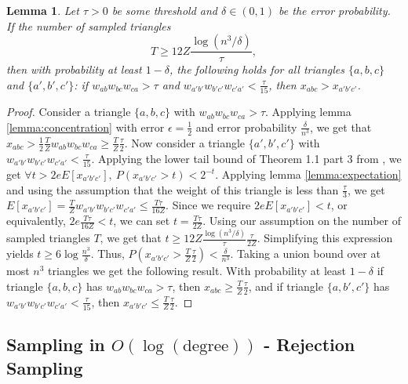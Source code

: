 \documentclass{article}
\newtheorem{lemma}{Lemma}
\begin{document}
\begin{lemma}
Let $\tau > 0$ be some threshold and $\delta \in (0,1)$ be
the error probability.
If the number of sampled triangles
\begin{equation*}
  T \geq 12 Z \frac{\log{(n^3/\delta)}}{\tau},
\end{equation*}
then with probability at least $1 - \delta$, the following
holds for all triangles $\{a,b,c\}$ and $\{a',b',c'\}$: if
$w_{ab}w_{bc}w_{ca} > \tau$ and $w_{a'b'}w_{b'c'}w_{c'a'} <
\frac{\tau}{15}$, then $x_{abc} > x_{a'b'c'}$.
\end{lemma}
\begin{proof}
Consider a triangle $\{a,b,c\}$ with $w_{ab}w_{bc}w_{ca} > 
\tau$. Applying lemma \ref{lemma:concentration} with
error $\epsilon = \frac{1}{2}$ and error probability
$\frac{\delta}{n^3}$, we get that $x_{abc} > \frac{1}{2}
\frac{T}{Z} w_{ab}w_{bc}w_{ca} \geq \frac{T}{Z} \frac{\tau}{2}$.
Now consider a triangle $\{a',b',c'\}$ with $w_{a'b'}w_{b'c'}w_{c'a'} < \frac{\tau}{15}$. Applying the
lower tail bound of Theorem 1.1 part 3 from \cite{concentration-book}, we get $\forall t > 2e E[x_{a'b'c'}],\ P(x_{a'b'c'} > t) < 2^{-t}$. Applying lemma 
\ref{lemma:expectation} and using the assumption that the
weight of this triangle is less than $\frac{\tau}{3}$, we 
get $E[x_{a'b'c'}] = \frac{T}{Z}w_{a'b'}w_{b'c'}w_{c'a'}
\leq \frac{T\tau}{16Z}$. Since we require $2e E[x_{a'b'c'}]
< t$, or equivalently, $2e \frac{T\tau}{16Z} < t$, we can
set $t = \frac{T\tau}{2Z}$. Using our assumption on the
number of sampled triangles $T$, we get that $t \geq 12 Z
\frac{\log{(n^3/\delta)}}{\tau} \frac{\tau}{2Z}$.
Simplifying this expression yields $t \geq 6 \log{\frac{n^3}{\delta}}$. Thus, $P(x_{a'b'c'} > \frac{T}{Z} \frac{\tau}{2}) < \frac{\delta}{n^3}$.
Taking a union bound over at most $n^3$ triangles we get the
following result. With probability at least $1-\delta$
if triangle $\{a,b,c\}$ has $w_{ab}w_{bc}w_{ca}>\tau$, then
$x_{abc} \geq \frac{T}{Z} \frac{\tau}{2}$, and if triangle
$\{a,b',c'\}$ has $w_{a'b'}w_{b'c'}w_{c'a'} < 
\frac{\tau}{15}$, then $x_{a'b'c'} \leq \frac{T}{Z}\frac{\tau}{2}$.
\end{proof}


\subsection{Sampling in $O(\log(\text{degree}))$ - Rejection Sampling}
\end{document}
